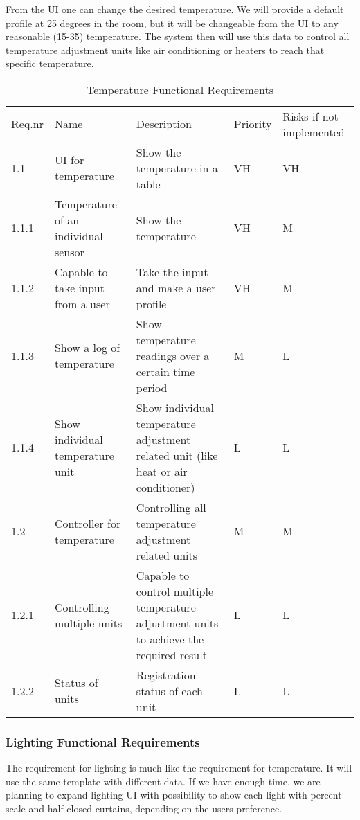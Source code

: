 \documentclass[../document]{subfiles}
\begin{document}
From the UI one can change the desired temperature. We will provide a default profile at 25 degrees in the room, but it will be changeable from the UI to any reasonable (15-35) temperature. The system then will use this data to control all temperature adjustment units like air conditioning or heaters to reach that specific temperature.

\begin{table}[H]
\caption{Temperature Functional Requirements}
\centering
\begin{tabularx}{\textwidth}{|l|X|X|l|X|}
	\hline
	\\ \hline Req.nr
	&Name
	&Description
	&Priority
	&Risks if not implemented
	\\ \hline 1.1
	&UI for temperature
	&Show the temperature in a table
	&VH
	&VH
	\\ \hline 1.1.1
	&Temperature of an individual sensor
	&Show the temperature 
	&VH
	&M
	\\ \hline 1.1.2
	&Capable to take input from a user
	&Take the input and make a user profile
	&VH
	&M
	\\ \hline 1.1.3
	&Show a log of temperature
	&Show temperature readings over a certain time period
	&M
	&L
	\\ \hline 1.1.4
	&Show individual temperature unit
	&Show individual temperature adjustment related unit (like heat or air conditioner)
	&L
	&L
	\\ \hline 1.2
	&Controller for temperature
	&Controlling all temperature adjustment related units
	&M
	&M
	\\ \hline 1.2.1
	&Controlling multiple units
	&Capable to control multiple temperature adjustment units to achieve the required result
	&L
	&L
	\\ \hline 1.2.2
	&Status of units
	&Registration status of each unit
	&L
	&L
	\\ \hline 
\end{tabularx}
\end{table}

\subsubsection{Lighting Functional Requirements}

The requirement for lighting is much like the requirement for temperature. It will use the same template with different data. If we have enough time, we are planning to expand lighting UI with possibility to show each light with percent scale and half closed curtains, depending on the users preference.
\end{document}

